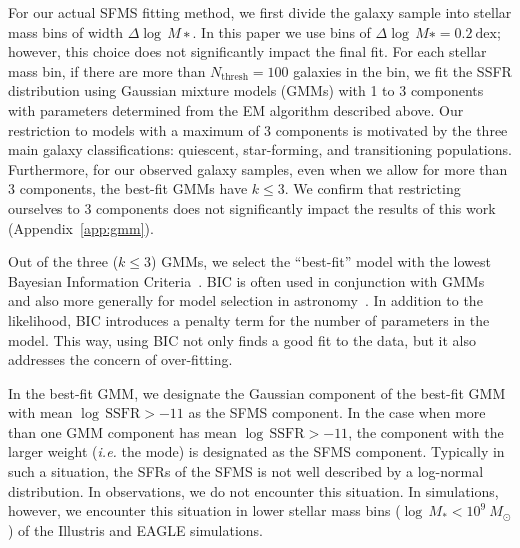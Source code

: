 \documentclass[preprint2,tighten]{aastex62}
\begin{document}
For our actual SFMS fitting method, we first divide the galaxy 
sample into stellar mass bins of width $\Delta \log\,M∗$. In 
this paper we use bins of $\Delta \log\,M∗ = 0.2\  \mathrm{dex}$; however, 
this choice does not significantly impact the final fit. For each stellar 
mass bin, if there are more than $N_\mathrm{thresh}=100$ galaxies in the bin, 
we fit the SSFR distribution using Gaussian mixture models (GMMs) 
with 1 to 3 components with parameters determined from the EM algorithm 
described above. Our restriction to models with a maximum of 3 components 
is motivated by the three main galaxy classifications: quiescent, 
star-forming, and transitioning populations. Furthermore, for our observed 
galaxy samples, even when we allow for more than 3 components, 
the best-fit GMMs have $k\leq3$. We confirm that restricting ourselves 
to 3 components does not significantly impact the results of this work
(Appendix~\ref{app:gmm}). 

Out of the three ($k\leq3$) GMMs, we select the ``best-fit'' model with the lowest Bayesian Information 
Criteria~\citep[BIC;][]{schwarz1978}. BIC is often used in conjunction with 
GMMs~\citep[\emph{e.g.}][]{leroux1992,roeder1997,fraley1998,steele2010performance} 
and also more generally for model selection in 
astronomy~\citep[\emph{e.g.}][]{liddle2007,broderick2011,vakili2016}.
In addition to the likelihood, BIC introduces a penalty term for the number
of parameters in the model. This way, using BIC not only finds a good fit to 
the data, but it also addresses the concern of over-fitting. 

In the best-fit GMM, we designate the Gaussian component of the 
best-fit GMM with mean $\log\,\mathrm{SSFR} > −11$ as the SFMS component.
In the case when more than one GMM component has mean 
$\log\,\mathrm{SSFR} > −11$, the component with the larger weight 
(\emph{i.e.} the mode) is designated as the SFMS component. Typically in such a 
situation, the SFRs of the SFMS is not well described by a log-normal
distribution. In observations, we do not encounter this situation. 
In simulations, however, we encounter this situation in lower stellar mass bins 
($\log\,M_* < 10^{9}\ M_\odot$) of the Illustris and EAGLE simulations. 
\end{document}

